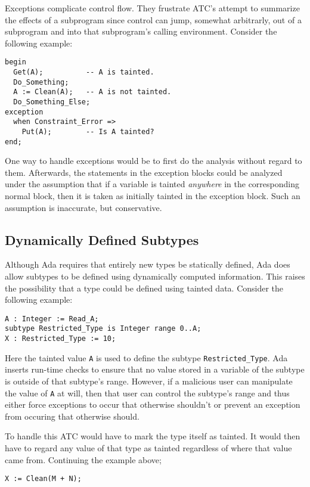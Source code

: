 \documentclass{article}
\begin{document}
Exceptions complicate control flow. They frustrate ATC's attempt to summarize the effects of a subprogram since control can jump, somewhat arbitrarly, out of a subprogram and into that subprogram's calling environment. Consider the following example:

\begin{verbatim}
begin
  Get(A);          -- A is tainted.
  Do_Something;
  A := Clean(A);   -- A is not tainted.
  Do_Something_Else;
exception
  when Constraint_Error =>
    Put(A);        -- Is A tainted?
end;
\end{verbatim}

One way to handle exceptions would be to first do the analysis without regard to them. Afterwards, the statements in the exception blocks could be analyzed under the assumption that if a variable is tainted \emph{anywhere} in the corresponding normal block, then it is taken as initially tainted in the exception block. Such an assumption is inaccurate, but conservative.

\subsection{Dynamically Defined Subtypes}

Although Ada requires that entirely new types be statically defined, Ada does allow subtypes to be defined using dynamically computed information. This raises the possibility that a type could be defined using tainted data. Consider the following example:

\begin{verbatim}
A : Integer := Read_A;
subtype Restricted_Type is Integer range 0..A;
X : Restricted_Type := 10;
\end{verbatim}

Here the tainted value \texttt{A} is used to define the subtype \texttt{Restricted\_Type}. Ada inserts run-time checks to ensure that no value stored in a variable of the subtype is outside of that subtype's range. However, if a malicious user can manipulate the value of \texttt{A} at will, then that user can control the subtype's range and thus either force exceptions to occur that otherwise shouldn't or prevent an exception from occuring that otherwise should.

To handle this ATC would have to mark the type itself as tainted. It would then have to regard any value of that type as tainted regardless of where that value came from. Continuing the example above;

\begin{verbatim}
X := Clean(M + N);
\end{verbatim}
\end{document}
